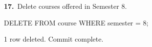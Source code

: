 \noindent\begin{minipage}{\linewidth}
\begingroup{}
{\fontsize{14}{17}\selectfont\textbf{17.}}\ Delete courses offered in Semester 8.\par
\endgroup\vspace{12pt}


\begin{sqlcode}
DELETE FROM course WHERE semester = 8;
\end{sqlcode}

\vspace{18pt}


\begin{sqlout}[fontsize=\small]
1 row deleted.
Commit complete.
\end{sqlout}
\end{minipage}\par\vspace{24pt}

